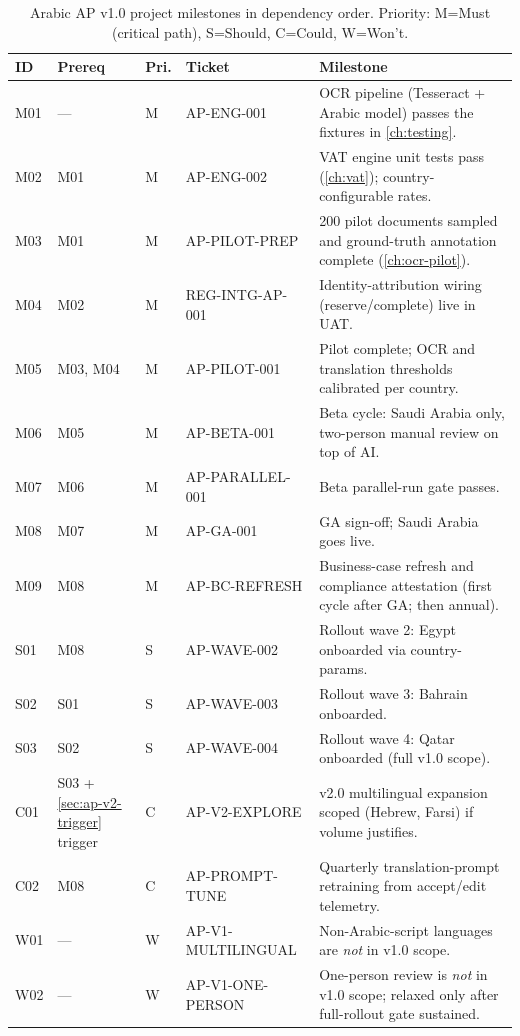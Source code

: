 \documentclass[11pt,a4paper,twoside]{report}
\begin{document}
\begin{table}[htbp]
\centering
\caption{Arabic AP v1.0 project milestones in dependency order.
Priority: M=Must (critical path), S=Should, C=Could, W=Won't.}
\label{tab:ap-milestones}
\footnotesize
\begin{tabularx}{\linewidth}{@{}l l l l X@{}}
\toprule
\textbf{ID} & \textbf{Prereq} & \textbf{Pri.} & \textbf{Ticket} & \textbf{Milestone} \\ \midrule
M01 & ---       & M & AP-ENG-001         & OCR pipeline (Tesseract + Arabic model) passes the fixtures in \cref{ch:testing}. \\
M02 & M01       & M & AP-ENG-002         & VAT engine unit tests pass (\cref{ch:vat}); country-configurable rates.\\
M03 & M01       & M & AP-PILOT-PREP      & 200 pilot documents sampled and ground-truth annotation complete (\cref{ch:ocr-pilot}). \\
M04 & M02       & M & REG-INTG-AP-001    & Identity-attribution wiring (reserve/complete) live in UAT. \\
M05 & M03, M04  & M & AP-PILOT-001       & Pilot complete; OCR and translation thresholds calibrated per country. \\
M06 & M05       & M & AP-BETA-001        & Beta cycle: Saudi Arabia only, two-person manual review on top of AI. \\
M07 & M06       & M & AP-PARALLEL-001    & Beta parallel-run gate passes. \\
M08 & M07       & M & AP-GA-001          & GA sign-off; Saudi Arabia goes live. \\
M09 & M08       & M & AP-BC-REFRESH      & Business-case refresh and compliance attestation (first cycle after GA; then annual). \\
S01 & M08       & S & AP-WAVE-002        & Rollout wave 2: Egypt onboarded via country-params. \\
S02 & S01       & S & AP-WAVE-003        & Rollout wave 3: Bahrain onboarded. \\
S03 & S02       & S & AP-WAVE-004        & Rollout wave 4: Qatar onboarded (full v1.0 scope). \\
C01 & S03 + \cref{sec:ap-v2-trigger} trigger & C & AP-V2-EXPLORE & v2.0 multilingual expansion scoped (Hebrew, Farsi) if volume justifies. \\
C02 & M08       & C & AP-PROMPT-TUNE     & Quarterly translation-prompt retraining from accept/edit telemetry. \\
W01 & ---       & W & AP-V1-MULTILINGUAL & Non-Arabic-script languages are \emph{not} in v1.0 scope. \\
W02 & ---       & W & AP-V1-ONE-PERSON   & One-person review is \emph{not} in v1.0 scope; relaxed only after full-rollout gate sustained. \\
\bottomrule
\end{tabularx}
\end{table}
\end{document}
